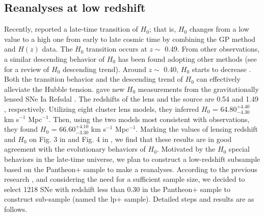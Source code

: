 \documentclass{aa}
\begin{document}
\subsection{Reanalyses at low redshift}
Recently, \citet{2022MNRAS.517..576H} reported a late-time transition of $H_{0}$; that is, $H_{0}$ changes from a low value to a high one from early to late cosmic time by combining the GP method and $H(z)$ data. The $H_{0}$ transition occurs at $z \sim$ 0.49. From other observations, a similar descending behavior of $H_{0}$ has been found adopting other methods (see \citet{2023Univ....9...94H} for a review of $H_{0}$ descending trend). Around $z \sim$ 0.40, $H_{0}$ starts to decrease \citep{2023A&A...674A..45J}. Both the transition behavior and the descending trend of $H_{0}$ can effectively alleviate the Hubble tension. \citet{2023Sci...380.1322K} gave new $H_{0}$ measurements from the gravitationally lensed SNe Ia Refsdal \citep{1964MNRAS.128..295R}. The redshifts of the lens and the source are 0.54 and 1.49 \citep{2015Sci...347.1123K}, respectively. Utilizing eight cluster lens models, they inferred $H_{0}$ = 64.80$_{-4.30}^{+4.40}$ km s$^{-1}$ Mpc$^{-1}$. Then, using the two models most consistent with observations, they found $H_{0}$ = 66.60$_{-3.30}^{+4.10}$ km s$^{-1}$ Mpc$^{-1}$. Marking the values of lensing redshift and $H_{0}$ on Fig. 3 in \citet{2022MNRAS.517..576H} and Fig. 4 in \citet{2023A&A...674A..45J}, we find that these results are in good agreement with the evolutionary behaviors of $H_{0}$. Motivated by the $H_{0}$ special behaviors in the late-time universe, we plan to construct a low-redshift subsample based on the Pantheon+ sample to make a reanalyses. According to the previous research \citep{2022MNRAS.517..576H,2023A&A...674A..45J}, and considering the need for a sufficient sample size, we decided to select 1218 SNe with redshift less than 0.30 in the Pantheon+ sample to construct sub-sample (named the lp+ sample). Detailed steps and results are as follows. 
\end{document}
